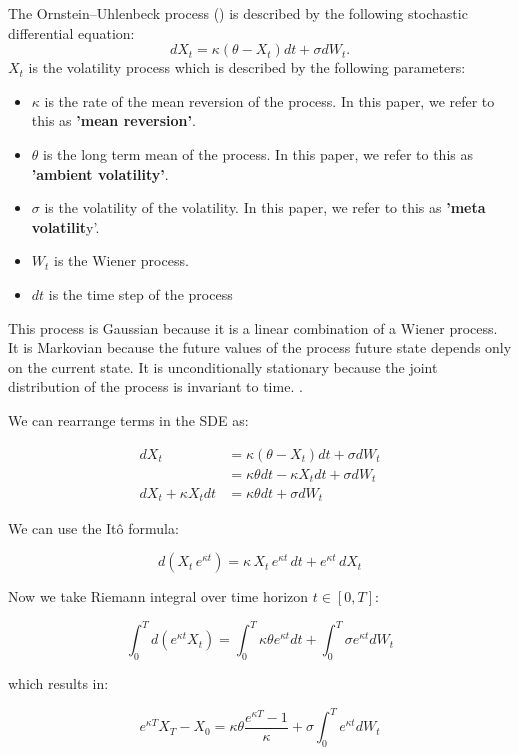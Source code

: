 The Ornstein–Uhlenbeck process (\cite{wiki:OrnsteinUhlenbeckProcess}) is described by the following stochastic differential equation:$$ dX_t = \kappa (\theta - X_t) dt + \sigma dW_t .$$
$X_t$ is the volatility process which is described by the following parameters:

\begin{itemize}
	\item $\kappa$ is the rate of the mean reversion of the process. In this paper, we refer to this as \textbf{'mean reversion'}.
	\item $\theta$ is the long term mean of the process. In this paper, we refer to this as \textbf{'ambient volatility'}.
	\item $\sigma$ is the volatility of the volatility.  In this paper, we refer to this as \textbf{'meta volatilit}y'.
	\item $W_t$ is the Wiener process.
	\item $dt$ is the time step of the process
\end{itemize}

This process is Gaussian because it is a linear combination of a Wiener process. It is Markovian because the future values of the process future state depends only on the current state. It is unconditionally stationary because the joint distribution of the process is invariant to time.  \cite{cantaroOuProcess}.

We can rearrange terms in the SDE as:

$$
\begin{aligned}
    dX_t &= \kappa (\theta - X_t) dt + \sigma dW_t \\
    &= \kappa \theta dt -\kappa X_t dt+\sigma dW_t \\        
    dX_t + \kappa X_t dt &= \kappa \theta dt + \sigma dW_t  
    \end{aligned}
$$

We can use the Itô formula:

$$
d( X_t \, e^{\kappa t} ) = \kappa \, X_t\, e^{\kappa t}\, dt + e^{\kappa t}\, dX_t
$$

Now we take Riemann integral over time horizon $t \in [0,T]$:

$$ 
\int^T_0 d(e^{\kappa t} X_t) = \int^T_0 \kappa \theta e^{\kappa t} dt + \int^T_0 \sigma e^{\kappa t} dW_t 
$$

which results in:

$$ 
e^{\kappa T} X_T - X_0 = \kappa \theta \frac{e^{\kappa T}-1}{\kappa} + \sigma \int^T_0 e^{\kappa t} dW_t
$$

